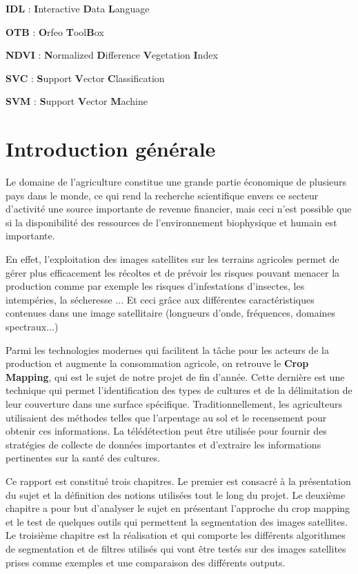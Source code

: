 \documentclass[12pt, openany]{report}
\begin{document}
\textbf{IDL} : \textbf{I}nteractive \textbf{D}ata \textbf{L}anguage
 
\textbf{OTB} : \textbf{O}rfeo \textbf{T}ool\textbf{B}ox
 
\textbf{NDVI} : \textbf{N}ormalized \textbf{D}ifference \textbf{V}egetation \textbf{I}ndex
 
\textbf{SVC} : \textbf{S}upport \textbf{V}ector \textbf{C}lassification
 
\textbf{SVM} : \textbf{S}upport \textbf{V}ector \textbf{M}achine

\listoffigures
\tableofcontents
\chapter*{Introduction générale}

Le domaine de l’agriculture constitue une grande partie économique de plusieurs pays dans le monde, ce qui rend la recherche scientifique envers ce secteur d’activité une source importante de revenue financier, mais ceci n’est possible que si la disponibilité des ressources de l’environnement biophysique et humain est importante.
\par
En effet, l’exploitation des images satellites sur les terrains agricoles permet de gérer plus efficacement les récoltes et de prévoir les risques pouvant menacer la production comme par exemple les risques d’infestations d’insectes, les intempéries, la sécheresse ... Et ceci grâce aux différentes caractéristiques contenues dans une image satellitaire (longueurs d’onde, fréquences, domaines spectraux...)
\par
Parmi les technologies modernes qui facilitent la tâche pour les acteurs de la production et augmente la consommation agricole, on retrouve le \textbf{Crop Mapping}, qui est le sujet de notre projet de fin d’année.  Cette dernière est une technique qui permet l'identification des types de cultures et de la délimitation de leur couverture dans une surface spécifique. Traditionnellement, les agriculteurs utilisaient des méthodes telles que l'arpentage au sol et le recensement pour obtenir ces informations. La télédétection peut être utilisée pour fournir des stratégies de collecte de données importantes et d'extraire les informations pertinentes sur la santé des cultures.

\par
Ce rapport est constitué trois chapitres. Le premier est consacré à la présentation du sujet et la définition des notions utilisées tout le long du projet. Le deuxième chapitre a pour but d'analyser le sujet en présentant l’approche du crop mapping et le test de quelques outils qui permettent la segmentation des images satellites.
Le troisième chapitre est la réalisation et qui comporte les différents algorithmes de segmentation et de filtres utilisés qui vont être testés sur des images satellites prises comme exemples et une comparaison des différents outputs.
\end{document}
